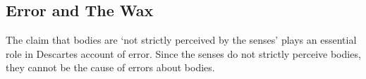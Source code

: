 \documentclass[12pt]{extarticle}
\begin{document}
\begin{multicols*}{3}
\section{Error and The Wax}
The claim that bodies are ‘not strictly perceived by the senses’ plays an essential
role in Descartes account of error. Since the senses do not strictly perceive bodies,
they cannot be the cause of errors about bodies.









\footnotesize


\end{multicols*}
\end{document}
